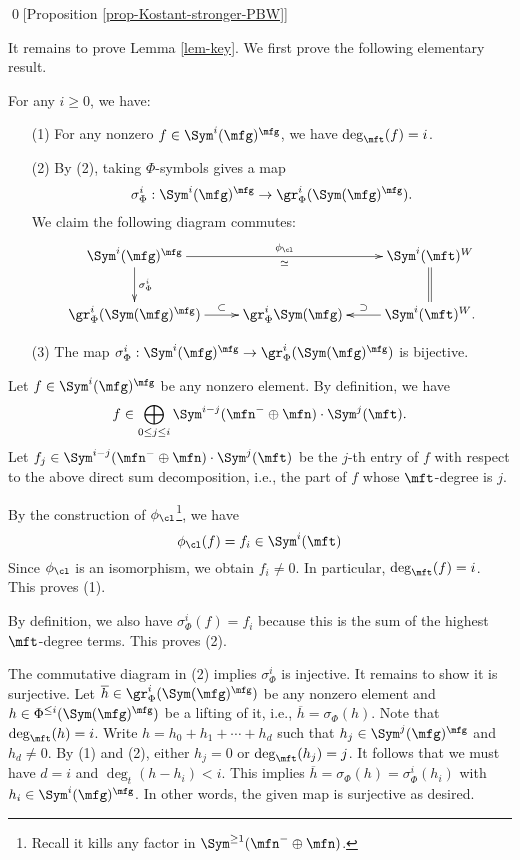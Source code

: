 	\qed[Proposition \ref{prop-Kostant-stronger-PBW}]

	It remains to prove Lemma \ref{lem-key}. We first prove the following elementary result.

		\begin{lem}
			\label{lem-Chev-via-symbol}
			For any $i\ge 0$, we have:
			\begin{itemize}
				\item[(1)]
					For any nonzero $f\in \Sym^i(\mfg)^\mfg$, we have $\deg_\mft(f) = i$.
				\item[(2)]
					By (2), taking $\Phi$-symbols gives a map
					\[
						\sigma_\Phi^i: \Sym^i(\mfg)^\mfg \to \gr_\Phi^i(\Sym(\mfg)^\mfg).
					\]
					We claim the following diagram commutes:
					\begin{equation}
						\label{eqn-key}
						\xymatrix{
							\Sym^i(\mfg)^\mfg \ar[d]^-{\sigma_\Phi^i} \ar[rr]^-{\phi_\cl}_-\simeq
							& & \Sym^i(\mft)^W  \ar@{=}[d] \\
							\gr_\Phi^i(\Sym(\mfg)^\mfg) \ar[r]^-\subset
							& \gr_\Phi^i \Sym(\mfg) 
							& \Sym^i(\mft)^W. \ar[l]_-\supset
						}
					\end{equation}
				\item[(3)]
					The map $\sigma_\Phi^i: \Sym^i(\mfg)^\mfg \to \gr_\Phi^i(\Sym(\mfg)^\mfg)$  is bijective.
			\end{itemize}
		\end{lem}

		\proof
			Let $f\in \Sym^i(\mfg)^\mfg$ be any nonzero element. By definition, we have
			\[
				f\in \bigoplus_{0\le j\le i} \Sym^{i-j}(\mfn^-\oplus \mfn) \cdot \Sym^{j}(\mft).
			\] 
			Let $f_j\in \Sym^{i-j}(\mfn^-\oplus \mfn) \cdot \Sym^{j}(\mft)$ be the $j$-th entry of $f$ with respect to the above direct sum decomposition, i.e., the part of $f$ whose $\mft$-degree is $j$.

			By the construction of $\phi_\cl$\footnote{Recall it kills any factor in $\Sym^{\ge 1}(\mfn^-\oplus \mfn)$.}, we have
			\[
				\phi_\cl(f) = f_i \in \Sym^{i}(\mft)
			\]
			Since $\phi_\cl$ is an isomorphism, we obtain $f_i\neq 0$. In particular, $\deg_\mft(f) = i$. This proves (1).

			By definition, we also have $\sigma_\Phi^i(f) = f_i$ because this is the sum of the highest $\mft$-degree terms. This proves (2).

			The commutative diagram in (2) implies $\sigma_\Phi^i$ is injective. It remains to show it is surjective. Let $\overline{h} \in \gr_\Phi^i(\Sym(\mfg)^\mfg) $ be any nonzero element and $h\in \Phi^{\le i}(\Sym(\mfg)^\mfg)$ be a lifting of it, i.e., $ \overline{h}=\sigma_\Phi(h)  $. Note that $\deg_\mft(h) = i$. Write $h = h_0+h_1+\cdots+ h_d$ such that $h_j \in \Sym^j(\mfg)^\mfg$ and $h_d\neq 0$. By (1) and (2), either $h_j = 0$ or $\deg_\mft(h_j) = j$. It follows that we must have $d=i$ and $\deg_t(h-h_i)<i$. This implies $\overline{h}=\sigma_\Phi(h)  = \sigma_\Phi^i(h_i)$ with $h_i \in \Sym^i(\mfg)^\mfg$. In other words, the given map is surjective as desired.

